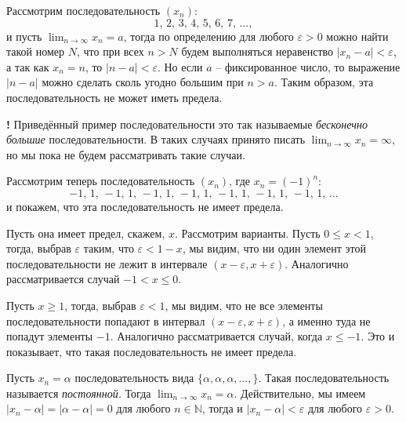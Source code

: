 \begin{example}
Рассмотрим последовательность $(x_n):$
\[
 1,\,2,\,3,\, 4,\, 5,\, 6,\, 7,\, \ldots,
\]
и пусть $\lim_{n \to \infty}x_n = a$, тогда по определению для любого $\varepsilon>0$ можно найти такой номер $N$, что при всех $n>N$ будем выполняться неравенство $|x_n - a|<\varepsilon$, а так как $x_n = n$, то $|n-a|<\varepsilon$. Но если $a$ -- фиксированное число, то выражение $|n-a|$ можно сделать сколь угодно большим при $n>a$. Таким образом, эта последовательность не может иметь предела.    
\end{example}

\begin{mydanger}{\bf !}
 Приведённый пример последовательности это так называемые \textit{бесконечно большие} последовательности. В таких случаях принято писать $\lim_{n\to \infty}x_n = \infty$, но мы пока не будем рассматривать такие случаи.
\end{mydanger}

\begin{example}\label{(-1)^n}
Рассмотрим теперь последовательность $(x_n)$, где $x_n = (-1)^n:$
\[
 -1,\, 1,\,-1,\, 1,\,-1,\, 1,\,-1,\, 1,\,-1,\, 1,\,-1,\, 1,\,-1,\, 1,\, \ldots
\]
и покажем, что эта последовательность не имеет предела.

Пусть она имеет предел, скажем, $x$. Рассмотрим варианты. Пусть $0 \le x <1$, тогда, выбрав $\varepsilon$ таким, что $\varepsilon < 1-x$, мы видим, что ни один элемент этой последовательности не лежит в интервале $(x- \varepsilon, x+\varepsilon)$. Аналогично рассматривается случай $-1<x\le 0$.

Пусть $x\ge 1$, тогда, выбрав $\varepsilon < 1$, мы видим, что не все элементы последовательности попадают в интервал $(x-\varepsilon, x+ \varepsilon)$, а именно туда не попадут элементы $-1$. Аналогично рассматривается случай, когда $x\le -1$. Это и показывает, что такая последовательность не имеет предела.
\end{example}

\begin{example}
    Пусть $x_n =\alpha$ последовательность вида $\{\alpha, \alpha, \alpha, \ldots,\}.$ Такая последовательность называется \textit{постоянной.} Тогда $\lim_{n\to \infty }x_n = \alpha$. Действительно, мы имеем $|x_n - \alpha| = |\alpha - \alpha| = 0$ для любого $n \in \mathbb{N}$, тогда и $|x_n - \alpha| < \varepsilon$ для любого $\varepsilon>0.$
\end{example}


